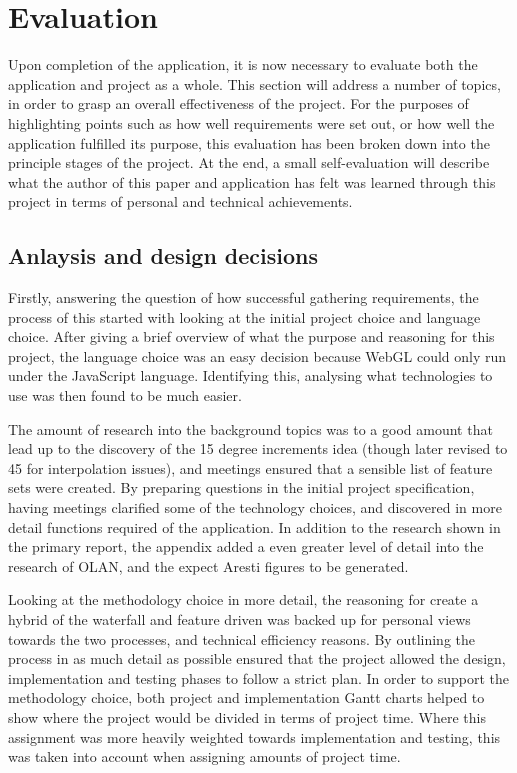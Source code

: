 \chapter{Evaluation}
Upon completion of the application, it is now necessary to evaluate both the application and project as a whole. This section will address a number of topics, in order to grasp an overall effectiveness of the project. For the purposes of highlighting points such as how well requirements were set out, or how well the application fulfilled its purpose, this evaluation has been broken down into the principle stages of the project. At the end, a small self-evaluation will describe what the author of this paper and application has felt was learned through this project in terms of personal and technical achievements.

\section{Anlaysis and design decisions}
Firstly, answering the question of how successful gathering requirements, the process of this started with looking at the initial project choice and language choice. After giving a brief overview of what the purpose and reasoning for this project, the language choice was an easy decision because WebGL could only run under the JavaScript language. Identifying this, analysing what technologies to use was then found to be much easier. 

The amount of research into the background topics was to a good amount that lead up to the discovery of the 15 degree increments idea (though later revised to 45 for interpolation issues), and meetings ensured that a sensible list of feature sets were created. By preparing questions in the initial project specification, having meetings clarified some of the technology choices, and discovered in more detail functions required of the application. In addition to the research shown in the primary report, the appendix added a even greater level of detail into the research of OLAN, and the expect Aresti figures to be generated.

Looking at the methodology choice in more detail, the reasoning for create a hybrid of the waterfall and feature driven was backed up for personal views towards the two processes, and technical efficiency reasons. By outlining the process in as much detail as possible ensured that the project allowed the design, implementation and testing phases to follow a strict plan. In order to support the methodology choice, both project and implementation Gantt charts helped to show where the project would be divided in terms of project time. Where this assignment was more heavily weighted towards implementation and testing, this was taken into account when assigning amounts of project time.

